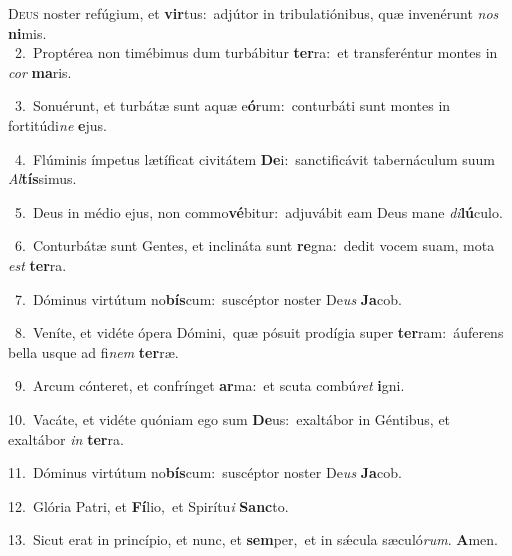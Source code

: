 \lettrine{\initial\textcolor{\initialcolor}{D}}{eus} noster refúgium, et \textbf{vir}\-tus:~\star adjútor in tribulatiónibus, quæ invenérunt \textit{nos} \textbf{ni}\-mis.\\
{\numbfont\textcolor{\numbcolor}{~2.}}~Proptérea non timébimus dum turbábitur \textbf{ter}\-ra:~\star et transferéntur montes in \textit{cor} \textbf{ma}\-ris.\par
{\numbfont\textcolor{\numbcolor}{~3.}}~Sonuérunt, et turbátæ sunt aquæ e\-\textbf{ó}\-rum:~\star conturbáti sunt montes in fortitúdi\textit{ne} \textbf{e}\-jus.\par
{\numbfont\textcolor{\numbcolor}{~4.}}~Flúminis ímpetus lætíficat civitátem \textbf{De}\-i:~\star sanctificávit tabernáculum suum \textit{Al}\-\textbf{tís}simus.\par
{\numbfont\textcolor{\numbcolor}{~5.}}~Deus in médio ejus, non commo\-\textbf{vé}\-bitur:~\star adjuvábit eam Deus mane \textit{di}\-\textbf{lú}culo.\par
{\numbfont\textcolor{\numbcolor}{~6.}}~Conturbátæ sunt Gentes, et inclináta sunt \textbf{re}\-gna:~\star dedit vocem suam, mota \textit{est} \textbf{ter}\-ra.\par
{\numbfont\textcolor{\numbcolor}{~7.}}~Dóminus virtútum no\-\textbf{bís}\-cum:~\star suscéptor noster De\textit{us} \textbf{Ja}\-cob.\par
{\numbfont\textcolor{\numbcolor}{~8.}}~Veníte, et vidéte ópera Dómini,~\dagger quæ pósuit prodígia super \textbf{ter}\-ram:~\star áuferens bella usque ad fi\textit{nem} \textbf{ter}\-ræ.\par
{\numbfont\textcolor{\numbcolor}{~9.}}~Arcum cónteret, et confrínget \textbf{ar}\-ma:~\star et scuta combú\textit{ret} \textbf{i}\-gni.\par
{\numbfont\textcolor{\numbcolor}{10.}}~Vacáte, et vidéte quóniam ego sum \textbf{De}\-us:~\star exaltábor in Géntibus, et exaltábor \textit{in} \textbf{ter}\-ra.\par
{\numbfont\textcolor{\numbcolor}{11.}}~Dóminus virtútum no\-\textbf{bís}\-cum:~\star suscéptor noster De\textit{us} \textbf{Ja}\-cob.\par
{\numbfont\textcolor{\numbcolor}{12.}}~Glória Patri, et \textbf{Fí}\-lio,~\star et Spirítu\textit{i} \textbf{Sanc}\-to.\par
{\numbfont\textcolor{\numbcolor}{13.}}~Sicut erat in princípio, et nunc, et \textbf{sem}\-per,~\star et in sǽcula sæculó\-\textit{rum}\-. \textbf{A}\-men.\par
